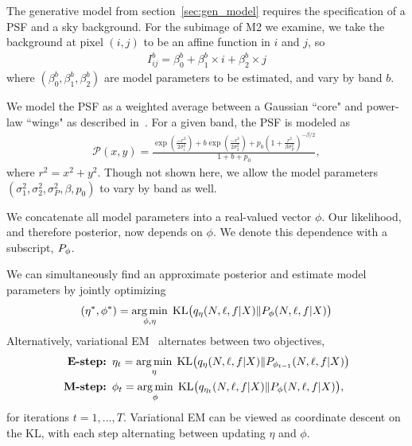 The generative model from section~\ref{sec:gen_model} requires
the specification of a PSF and a sky background. 
For the subimage of M2 we examine, 
we take the background at pixel $(i, j)$ to be an affine function in $i$ and $j$, so 
\begin{align}
    I_{ij}^{b} = \beta_0^{b} + \beta_1^{b} \times i + \beta_2^{b} \times j
\end{align}
where $(\beta_0^{b}, \beta_1^{b}, \beta_2^{b})$ are model parameters to be estimated, and 
vary by band $b$. 


We model the PSF as a weighted average between a Gaussian ``core" and power-law ``wings" as described in~\cite{Xin2018psf}. For a given band, the PSF is modeled as 
\begin{align}
    \mathcal{P}(x, y) = \frac{\exp(\frac{-r^2}{2\sigma_1^2}) + 
                            b \exp(\frac{-r^2}{2\sigma_2^2}) + 
                            p_0(1 + \frac{r^2}{\beta\sigma^2_P})^{-\beta/2} }{1 + b + p_0},
\end{align}
where $r^2 = x^2 + y^2$. Though not shown here, we allow the model parameters 
$(\sigma_1^2, \sigma_2^2, \sigma_P^2, \beta, p_0)$ to vary by band as well. 

We concatenate all model parameters into a real-valued vector $\phi$. Our likelihood, and therefore posterior, now depends on $\phi$. We denote this dependence with a subscript, $P_\phi$. 

We can simultaneously find an approximate posterior and 
estimate model parameters by jointly optimizing 
\begin{align}
(\eta^*, \phi^*) = \operatorname*{arg\,min}_{\phi, \eta} \; \mathrm{KL}\big (q_{\eta}(N, \ell, f |X) \| P_{\phi}(N, \ell, f | X)\big)\label{eq:em_obj}
\end{align}
Alternatively, variational EM~\cite{Jordan_intro_vi, neal2000varem, Beal2002varem} alternates between two objectives,
\begin{align}
    \text{{\bf E-step: }} & 
    \eta_{t} = \operatorname*{arg\,min}_\eta \; \mathrm{KL}\big (q_{\eta    }(N, \ell, f |X) \| P_{\phi_{t - 1}}(N, \ell, f | X)\big)
    \label{eq:e_step}
    \\
    \text{{\bf M-step: }} & \phi_{t} = \operatorname*{arg\,min}_{\phi} \; \mathrm{KL}\big (q_{\eta_t}(N, \ell, f |X) \| P_{\phi}(N, \ell, f | X)\big), 
    \label{eq:m_step}
\end{align}
for iterations $t = 1, ..., T$. Variational EM can be viewed as coordinate descent on the KL, with each step alternating between updating $\eta$ and $\phi$. 

